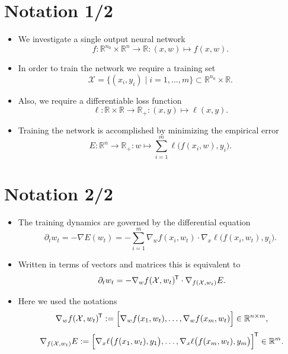 \documentclass[t]{beamer}
\renewcommand{\R}{\mathbb{R}}
\newcommand{\X}{\mathcal{X}}
\renewcommand*{\tr}{^{\mkern-1.5mu\mathsf{T}}}
\begin{document}

\section{Notation 1/2}
\begin{frame}
\begin{itemize}
\item We investigate a single output neural network
\[ f: \R^{n_0} \times \R^n \to \R : (x,w) \mapsto f(x,w). \]
\item In order to train the network we require a training set
\[ \X = \big \{ (x_i,y_i) \mid i=1, \dots, m \big \} \subset \R^{n_0} \times \R. \] 
\item Also, we require a differentiable loss function
\[ \ell: \R \times \R \to \R_+ : (x,y) \mapsto \ell(x,y). \]
\item Training the network is accomplished by minimizing the empirical error
\[ E : \R^n \to \R_+ : w \mapsto \sum_{i=1}^{m} \ell \big (f(x_i,w), y_i \big ). \]
\end{itemize}
\end{frame}



\section{Notation 2/2}
\begin{frame}
\begin{itemize}
\item The training dynamics are governed by the differential equation
\[ \partial_t w_t = -\nabla E (w_t ) = - \sum_{i=1}^{m} \nabla_w f(x_i,w_t) \cdot \nabla _x \ell \big ( f(x_i,w_t), y_i \big ). \]
\item Written in terms of vectors and matrices this is equivalent to
\[ \partial_tw_t = - \nabla_w f(\X, w_t)\tr \cdot \nabla_{f(\X,w_t)} E. \]
\item Here we used the notations
\[ \nabla_w f(\X, w_t)\tr := \Big [ \nabla_wf(x_1,w_t), \dots, \nabla_wf(x_m, w_t) \Big ] \in \R^{n \times m}, \]
\[ \nabla_{f(\X,w_t)} E := \Big [ \nabla_x \ell \big ( f(x_1,w_t), y_1 \big ), \dots, \nabla_x \ell \big ( f(x_m,w_t), y_m \big ) \Big ]\tr \in \R^m. \]
\end{itemize}
\end{frame}
\end{document}
